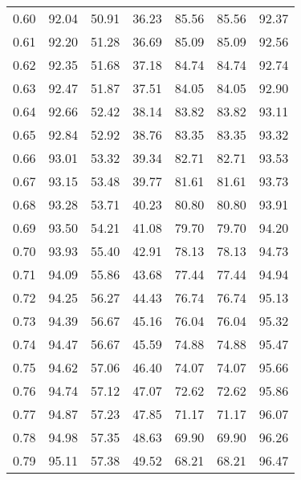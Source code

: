 \begin{tabular}{|c|c|c|c|c|c|c|}
      0.60 &     92.04 &     50.91 &      36.23 &   85.56 &      85.56 &         92.37 \\
      0.61 &     92.20 &     51.28 &      36.69 &   85.09 &      85.09 &         92.56 \\
      0.62 &     92.35 &     51.68 &      37.18 &   84.74 &      84.74 &         92.74 \\
      0.63 &     92.47 &     51.87 &      37.51 &   84.05 &      84.05 &         92.90 \\
      0.64 &     92.66 &     52.42 &      38.14 &   83.82 &      83.82 &         93.11 \\
      0.65 &     92.84 &     52.92 &      38.76 &   83.35 &      83.35 &         93.32 \\
      0.66 &     93.01 &     53.32 &      39.34 &   82.71 &      82.71 &         93.53 \\
      0.67 &     93.15 &     53.48 &      39.77 &   81.61 &      81.61 &         93.73 \\
      0.68 &     93.28 &     53.71 &      40.23 &   80.80 &      80.80 &         93.91 \\
      0.69 &     93.50 &     54.21 &      41.08 &   79.70 &      79.70 &         94.20 \\
      0.70 &     93.93 &     55.40 &      42.91 &   78.13 &      78.13 &         94.73 \\
      0.71 &     94.09 &     55.86 &      43.68 &   77.44 &      77.44 &         94.94 \\
      0.72 &     94.25 &     56.27 &      44.43 &   76.74 &      76.74 &         95.13 \\
      0.73 &     94.39 &     56.67 &      45.16 &   76.04 &      76.04 &         95.32 \\
      0.74 &     94.47 &     56.67 &      45.59 &   74.88 &      74.88 &         95.47 \\
      0.75 &     94.62 &     57.06 &      46.40 &   74.07 &      74.07 &         95.66 \\
      0.76 &     94.74 &     57.12 &      47.07 &   72.62 &      72.62 &         95.86 \\
      0.77 &     94.87 &     57.23 &      47.85 &   71.17 &      71.17 &         96.07 \\
      0.78 &     94.98 &     57.35 &      48.63 &   69.90 &      69.90 &         96.26 \\
      0.79 &     95.11 &     57.38 &      49.52 &   68.21 &      68.21 &         96.47 \\

\end{tabular}
